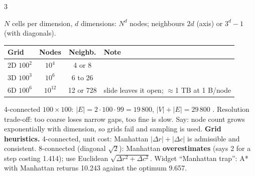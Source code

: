 \begin{multicols}{3}
\raggedright $N$ cells per dimension, $d$ dimensions: $N^d$ nodes; neighbours $2d$ (axis) or $3^d-1$ (with diagonals).\par
\begin{tabularx}{\linewidth}{@{}lccX@{}}\toprule
Grid & Nodes & Neighb. & Note\\\midrule
2D $100^2$ & $10^4$ & 4 or 8 & \\
3D $100^3$ & $10^6$ & 6 to 26 & \\
6D $100^6$ & $10^{12}$ & 12 or 728 & slide leaves it open; $\approx$1 TB at 1 B/node\\\bottomrule
\end{tabularx}
4-connected $100\times100$: $|E|=2\cdot100\cdot99=19\,800$, $|V|+|E|=29\,800$ \chk. Resolution trade-off: too coarse loses narrow gaps, too fine is slow. Say: node count grows exponentially with dimension, so grids fail and sampling is used.
\textbf{Grid heuristics.} 4-connected, unit cost: Manhattan $|\Delta r|+|\Delta c|$ is admissible and consistent. 8-connected (diagonal $\sqrt2$): Manhattan \textbf{overestimates} (says 2 for a step costing 1.414); use Euclidean $\sqrt{\Delta r^2+\Delta c^2}$. Widget ``Manhattan trap'': A* with Manhattan returns 10.243 against the optimum 9.657.


\end{multicols}
